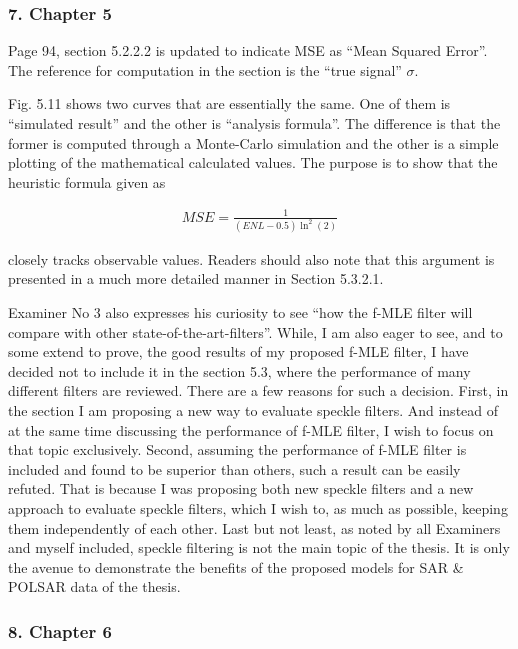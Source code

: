 \documentclass{article}
\begin{document}
\subsubsection*{7. Chapter 5}

Page 94, section 5.2.2.2 is updated to indicate MSE as ``Mean Squared Error''.
The reference for computation in the section is the ``true signal'' $\sigma$.

Fig. 5.11 shows two curves that are essentially the same.
One of them is ``simulated result'' and the other is ``analysis formula''.
The difference is that the former is computed through a Monte-Carlo simulation and the other is a simple plotting of the mathematical calculated values.
The purpose is to show that the heuristic formula given as

\begin{align*}
  MSE = \frac{1}{(ENL-0.5)\ln^2(2)}
\end{align*}  

closely tracks observable values.
Readers should also note that this argument is presented in a much more detailed manner in Section 5.3.2.1.

Examiner No 3 also expresses his curiosity to see ``how the f-MLE filter will compare with other state-of-the-art-filters''.
While, I am also eager to see, and to some extend to prove, the good results of my proposed f-MLE filter,
  I have decided not to include it in the section 5.3, where the performance of many different filters are reviewed.
There are a few reasons for such a decision.
First, in the section I am proposing a new way to evaluate speckle filters.
And instead of at the same time discussing the performance of f-MLE filter, I wish to focus on that topic exclusively.
Second, assuming the performance of f-MLE filter is included and found to be superior than others,
  such a result can be easily refuted.
That is because I was proposing both new speckle filters and a new approach to evaluate speckle filters,
  which I wish to, as much as possible, keeping them independently of each other.
Last but not least, as noted by all Examiners and myself included, speckle filtering is not the main topic of the thesis.
It is only the avenue to demonstrate the benefits of the proposed models for SAR \& POLSAR data of the thesis.

\subsubsection*{8. Chapter 6}
\end{document}
